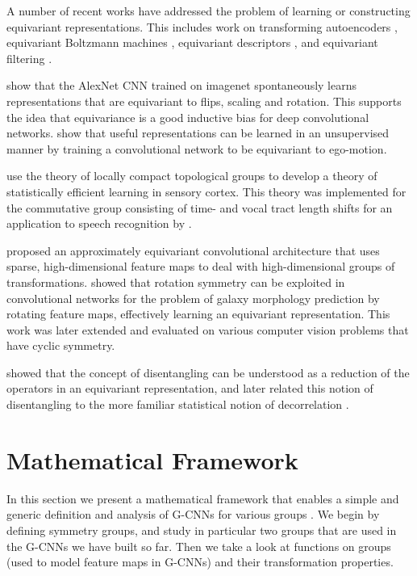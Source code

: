 \documentclass{article}
\begin{document}
A number of recent works have addressed the problem of learning or constructing equivariant representations.
This includes work on transforming autoencoders \cite{Hinton2011}, equivariant Boltzmann machines \cite{Kivinen2011, Sohn2012}, equivariant descriptors \cite{Schmidt2012}, and equivariant filtering \cite{Skibbe2013}.

\citet{Lenc2014} show that the AlexNet CNN \cite{Krizhevsky2012} trained on imagenet spontaneously learns representations that are equivariant to flips, scaling and rotation.
This supports the idea that equivariance is a good inductive bias for deep convolutional networks.
\citet{Agrawal} show that useful representations can be learned in an unsupervised manner by training a convolutional network to be equivariant to ego-motion.

\citet{Anselmi2014, Anselmi2015} use the theory of locally compact topological groups to develop a theory of statistically efficient learning in sensory cortex.
This theory was implemented for the commutative group consisting of time- and vocal tract length shifts for an application to speech recognition by \citet{Zhang2015}.

\citet{Gensa} proposed an approximately equivariant convolutional architecture that uses sparse, high-dimensional feature maps to deal with high-dimensional groups of transformations.
\citet{Dieleman2015} showed that rotation symmetry can be exploited in convolutional networks for the problem of galaxy morphology prediction by rotating feature maps, effectively learning an equivariant representation.
This work was later extended \cite{Dieleman2016} and evaluated on various computer vision problems that have cyclic symmetry.

\citet{Cohen2014} showed that the concept of disentangling can be understood as a reduction of the operators  in an equivariant representation, and later related this notion of disentangling to the more familiar statistical notion of decorrelation \cite{Cohen2015a}.

\section{Mathematical Framework}
\label{sec:framework}

In this section we present a mathematical framework that enables a simple and generic definition and analysis of G-CNNs for various groups .
We begin by defining symmetry groups, and study in particular two groups that are used in the G-CNNs we have built so far.
Then we take a look at functions on groups (used to model feature maps in G-CNNs) and their transformation properties.
\end{document}

